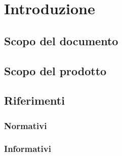\section{Introduzione}
\subsection{Scopo del documento}

\subsection{Scopo del prodotto}

\subsection{Riferimenti}

\subsubsection{Normativi}

\subsubsection{Informativi}
